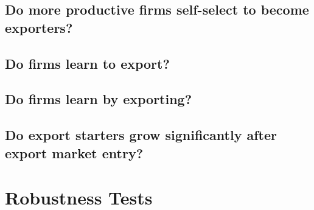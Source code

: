 \documentclass[11pt]{article}
\begin{document}
\subsection{Do more productive firms self-select to become
  exporters?}\label{subsec:selfselect}


\subsection{Do firms learn to export?}


\subsection{Do firms learn by exporting?}








\subsection{Do export starters grow significantly after export market
  entry?}


\section{Robustness Tests}\label{sec:robustness}
\end{document}
